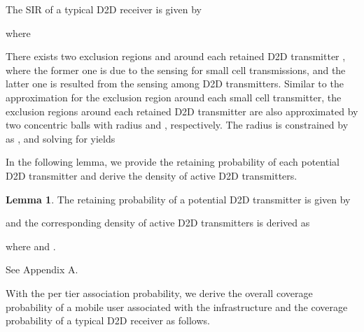 \documentclass[twocolumn,english]{IEEEtran}
\theoremstyle{plain}
\theoremstyle{definition}
\newtheorem{lemma}{\textbf{Lemma}}
\begin{document}
The SIR of a typical D2D receiver is given by

where


There exists two exclusion regions 
and  around each retained
D2D transmitter , where the former one is due to the sensing
for small cell transmissions, and the latter one is resulted from
the sensing among D2D transmitters. Similar to the approximation for
the exclusion region around each small cell transmitter, the exclusion
regions around each retained D2D transmitter are also approximated
by two concentric balls with radius  and ,
respectively. The radius  is constrained
by  as ,
and solving for  yields 

In the following lemma, we provide the retaining probability of each
potential D2D transmitter and derive the density of active D2D transmitters.

\begin{lemma}

The retaining probability of a potential D2D transmitter is given
by

and the corresponding density of active D2D transmitters is derived
as

where 
and .
\begin{IEEEproof}
See Appendix A.
\end{IEEEproof}
\end{lemma}

With the per tier association probability, we derive the overall coverage
probability of a mobile user associated with the infrastructure and
the coverage probability of a typical D2D receiver as follows.
\end{document}
